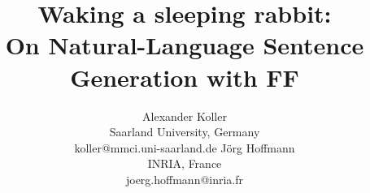 \documentclass[letterpaper]{article}
\begin{document}
\title{Waking a sleeping rabbit:\\ On Natural-Language Sentence Generation with FF}


\author{
Alexander Koller \\ Saarland University, Germany \\ koller@mmci.uni-saarland.de
\And
J\"org Hoffmann \\ INRIA, France \\ joerg.hoffmann@inria.fr
}


\maketitle












\end{document}
